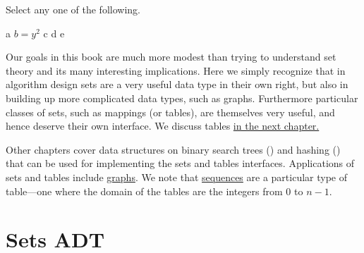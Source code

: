 \begin{gram}[10][Choices]
Select any one of the following.
\begin{pickone}
\choice a
\choice $b = y^2$
\correctchoice c
\correctchoice d
\choice e
\end{pickone}
\end{gram}

\begin{gram}[ 20  ] [ x]
\label{xy}
Our goals in this book are much more modest than trying to understand set theory and its many interesting implications.  Here we simply recognize that in algorithm design sets are a very useful data type in their own right, but also in building up more complicated data types, such as graphs.  Furthermore particular classes of sets, such as mappings (or tables), are themselves very useful, and hence deserve their own interface. 
%
We discuss tables \href{ch:tables}{in the next chapter.}

\end{gram}

\begin{gram}
Other chapters cover data structures on binary search trees
() and hashing () that can be used for
implementing the sets and tables interfaces. 
%
Applications of sets and tables include \href{ch:graphs::graphs}{graphs}.
%
We note that \href{ch:sequences::adt}{sequences} are a particular type of table---one where the domain of the tables are the integers from $0$ to $n-1$.  
\end{gram}



\section{Sets ADT}

